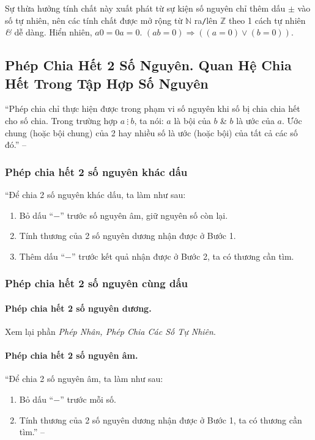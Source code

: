 \documentclass{article}
\numberwithin{equation}{section}
\begin{document}
Sự thừa hưởng tính chất này xuất phát từ sự kiện số nguyên chỉ thêm dấu $\pm$ vào số tự nhiên, nên các tính chất được mở rộng từ $\mathbb{N}$ ra\texttt{/}lên $\mathbb{Z}$ theo 1 cách tự nhiên \textit{\&} dễ dàng. Hiển nhiên, $a0 = 0a = 0$. $(ab = 0)\Rightarrow((a = 0)\lor(b = 0))$.


\subsection{Phép Chia Hết 2 Số Nguyên. Quan Hệ Chia Hết Trong Tập Hợp Số Nguyên}
``Phép chia chỉ thực hiện được trong phạm vi số nguyên khi số bị chia chia hết cho số chia. Trong trường hợp $a\ \vdots\ b$, ta nói: $a$ là bội của $b$ \& $b$ là ước của $a$. Ước chung (hoặc bội chung) của 2 hay nhiều số là ước (hoặc bội) của tất cả các số đó.'' -- \cite[p. 32]{Binh_Toan_6_tap_1}

\subsubsection{Phép chia hết 2 số nguyên khác dấu}
``Để chia 2 số nguyên khác dấu, ta làm như sau:
\begin{enumerate}
	\item Bỏ dấu ``$-$'' trước số nguyên âm, giữ nguyên số còn lại.
	\item Tính thương của 2 số nguyên dương nhận được ở Bước 1.
	\item Thêm dấu ``$-$'' trước kết quả nhận được ở Bước 2, ta có thương cần tìm.
\end{enumerate}

\subsubsection{Phép chia hết 2 số nguyên cùng dấu}

\paragraph{Phép chia hết 2 số nguyên dương.} Xem lại phần \textit{Phép Nhân, Phép Chia Các Số Tự Nhiên}.

\paragraph{Phép chia hết 2 số nguyên âm.} ``Để chia 2 số nguyên âm, ta làm như sau:
\begin{enumerate}
	\item Bỏ dấu ``$-$'' trước mỗi số.
	\item Tính thương của 2 số nguyên dương nhận được ở Bước 1, ta có thương cần tìm.'' -- \cite[p. 85]{SGK_Toan_6_Canh_Dieu_tap_1}
\end{enumerate}
\end{document}
